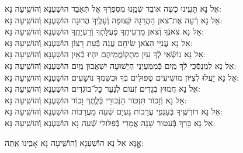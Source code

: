 \documentclass[twoside, openany, parskip=half, 11pt]{book}
\begin{document}
\begin{small}
	אֵל נָא תָּעִֽינוּ כְּֿשֶׂה אוֹבֵד שְֿׁמֵֽנוּ מִסִּפְרְֿךָ אַל תְּֿאַבֵּד \hfill הוֹשַׁעְנָא וְֿהוֹשִֽׁיעָה נָּא: \\
	אֵל נָא רְֿעֵה אֶת־צֹאן הַהֲרֵגָה קְֿצוּפָה וְֿעָלֶֽיךָ הֲרוּגָה \hfill הוֹשַׁעְנָא וְֿהוֹשִֽׁיעָה נָּא:\\
	אֵל נָא צֹאנְֿךָ וְֿצֹאן מַרְעִיתֶֽךָ פְּֿעֻלָּתְֿךָ וְֿרַעְיָתֶֽךָ \hfill הוֹשַׁעְנָא וְֿהוֹשִֽׁיעָה נָּא:\\
	אֵל נָא עֲנִיֵּי הַצֹּאן שִׂיחָם עֲנֵה בְּֿעֵת רָצוֹן \hfill הוֹשַׁעְנָא וְֿהוֹשִֽׁיעָה נָּא:\\
	אֵל נָא נוֹשְֿׂאֵי לְֿךָ עַֽיִן מִתְקוֹמֲמֵֽיהֶם יִהְיוּ כְֿאַֽיִן \hfill הוֹשַׁעְנָא וְֿהוֹשִֽׁיעָה נָּא:\\
	אֵל נָא לִמְנַסְּֿכֵי לְֿךָ מַֽיִם כְּֿמִמַּעַיְנֵי הַיְשׁוּעָה יִשְׁאֲבוּן מַֽיִם \hfill הוֹשַׁעְנָא וְֿהוֹשִֽׁיעָה נָּא:\\
	אֵל נָא יַעֲלוּ לְֿצִיּוֹן מוֹשִׁיעִים טְֿפוּלִים בְּֿךָ וּבְשִׁמְךָ נוֹשָׁעִים \hfill הוֹשַׁעְנָא וְֿהוֹשִֽׁיעָה נָּא:\\
	אֵל נָא חֲמוּץ בְּֿגָדִים זְֿעוֹם לְֿנַעֵר כׇּל־בּוֹגְֿדִים \hfill הוֹשַׁעְנָא וְֿהוֹשִֽׁיעָה נָּא:\\
	אֵל נָא וְֿזָכוֹר תִּזְכּוֹר הַנְּֿכוּרֵי בְּֿלֶֽתֶךְ וָכוֹר \hfill הוֹשַׁעְנָא וְֿהוֹשִֽׁיעָה נָּא:\\
	אֵל נָא דּוֹרְֿשֶֽׁיךָ בְּֿעַנְפֵי עֲרָבוֹת גַּעְיָם שְֿׁעֵה מֵעֲרָבוֹת \hfill הוֹשַׁעְנָא וְֿהוֹשִֽׁיעָה נָּא:\\
	אֵל נָא בָּרֵךְ בְּֿעִטּוּר שָׁנָה אֲמָרַי בְּֿפִלּוּלִי שְֿׁעֵה נָא \hfill הוֹשַׁעְנָא וְֿהוֹשִֽׁיעָה נָּא:
	
\end{small}

\begin{large}
	\shatzvkahal
	אׇׇׇׇָנָּא אֵל נָא הוֹשַׁעְנָא וְֿהוֹשִֽׁיעָה נָּא אָבִֽינוּ אַֽתָּה:
	
\end{large}
\end{document}
